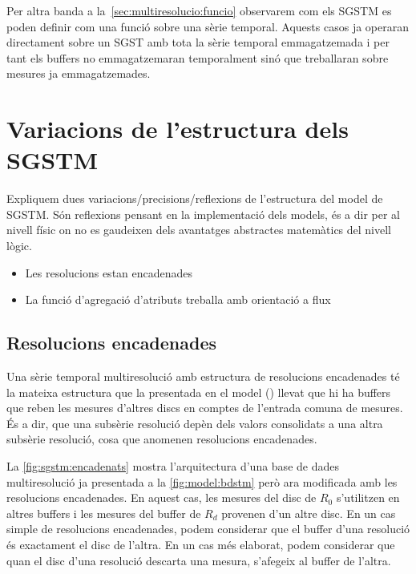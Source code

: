 Per altra banda a la~\autoref{sec:multiresolucio:funcio} observarem com els \gls{SGSTM} es poden definir com una funció sobre una sèrie temporal. Aquests casos ja operaran directament sobre un \gls{SGST} amb tota la sèrie temporal emmagatzemada i per tant els buffers no emmagatzemaran temporalment sinó que treballaran sobre mesures ja emmagatzemades. 











\section{Variacions de l'estructura dels SGSTM}



Expliquem dues variacions/precisions/reflexions de l'estructura del
model de \gls{SGSTM}.  Són reflexions pensant en la implementació dels
models, és a dir per al nivell físic on no es gaudeixen dels
avantatges abstractes matemàtics del nivell lògic.

\begin{itemize}
\item Les resolucions estan encadenades

\item La funció d'agregació d'atributs treballa amb orientació a flux

\end{itemize}







\subsection{Resolucions encadenades}


Una sèrie temporal multiresolució amb estructura de resolucions
encadenades té la mateixa estructura que la presentada en el model
() llevat que hi ha buffers que
reben les mesures d'altres discs en comptes de l'entrada comuna de
mesures.  És a dir, que una subsèrie resolució depèn dels valors
consolidats a una altra subsèrie resolució, cosa que anomenen
resolucions encadenades.


La \autoref{fig:sgstm:encadenats} mostra l'arquitectura d'una base de
dades multiresolució ja presentada a la \autoref{fig:model:bdstm} però
ara modificada amb les resolucions encadenades.  En aquest cas, les
mesures del disc de $R_0$ s'utilitzen en altres buffers i les mesures
del buffer de $R_d$ provenen d'un altre disc. En un cas simple de
resolucions encadenades, podem considerar que el buffer d'una
resolució és exactament el disc de l'altra. En un cas més elaborat,
podem considerar que quan el disc d'una resolució descarta una mesura,
s'afegeix al buffer de l'altra.


